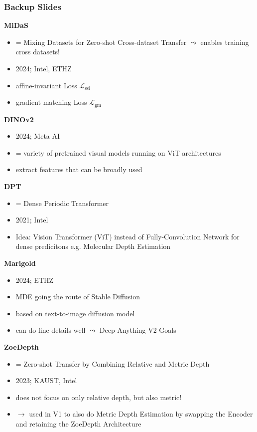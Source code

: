 \documentclass[12pt]{beamer}
\begin{document}
\begin{frame}
    \frametitle{Backup Slides}
    \scriptsize
    
    \textbf{MiDaS}
    \begin{itemize}
        \item = Mixing Datasets for Zero-shot Cross-dataset Transfer $\leadsto$ enables training cross datasets!
        \item 2024; Intel, ETHZ
        \item affine-invariant Loss $\mathcal{L}_\text{ssi}$
        \item gradient matching Loss $\mathcal{L}_\text{gm}$
    \end{itemize}

    \textbf{DINOv2}
    \begin{itemize}
        \item 2024; Meta AI
        \item = variety of pretrained visual models running on ViT architectures
        \item extract features that can be broadly used
    \end{itemize}

    \textbf{DPT}
    \begin{itemize}
        \item = Dense Periodic Transformer
        \item 2021; Intel
        \item Idea: Vision Transformer (ViT) instead of Fully-Convolution Network for dense predicitons e.g. Molecular Depth Estimation
    \end{itemize}

    
\end{frame}
\begin{frame}
    \scriptsize
    \textbf{Marigold}
    \begin{itemize}
        \item 2024; ETHZ
        \item MDE going the route of Stable Diffusion
        \item based on text-to-image diffusion model
        \item can do fine details well $\leadsto$ Deep Anything V2 Goals
    \end{itemize}
    \textbf{ZoeDepth}
    \begin{itemize}
        \item = Zero-shot Transfer by Combining Relative and Metric Depth
        \item 2023; KAUST, Intel
        \item does not focus on only relative depth, but also metric!
        \item $\rightarrow$ used in V1 to also do Metric Depth Estimation by swapping the Encoder and retaining the ZoeDepth Architecture
    \end{itemize}
\end{frame}
\end{document}
